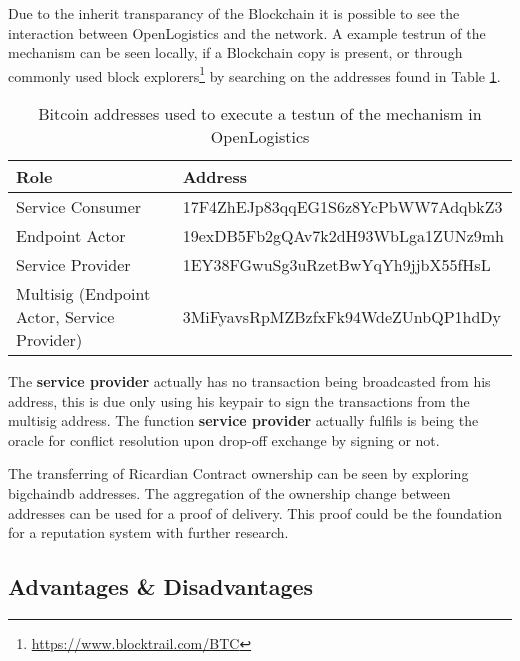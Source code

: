 Due to the inherit transparancy of the Blockchain it is possible to see the interaction between OpenLogistics and the network. A example testrun of the mechanism can be seen locally, if a Blockchain copy is present, or through commonly used block explorers\footnote{\url{https://www.blocktrail.com/BTC}}
 by searching on the addresses found in Table \ref{tab:addresses}.

\begin{table}[h]
  \begin{tabular}{ll}
    \hline
    \multicolumn{1}{|l|}{Role}                  & \multicolumn{1}{l|}{Address}                            \\ \hline
    \multicolumn{1}{|l|}{Service Consumer}      & \multicolumn{1}{l|}{17F4ZhEJp83qqEG1S6z8YcPbWW7AdqbkZ3} \\ \hline
    \multicolumn{1}{|l|}{Endpoint Actor}        & \multicolumn{1}{l|}{19exDB5Fb2gQAv7k2dH93WbLga1ZUNz9mh} \\ \hline
    \multicolumn{1}{|l|}{Service Provider}      & \multicolumn{1}{l|}{1EY38FGwuSg3uRzetBwYqYh9jjbX55fHsL} \\ \hline
    \multicolumn{1}{|l|}{Multisig (Endpoint Actor, Service Provider)}      & \multicolumn{1}{l|}{3MiFyavsRpMZBzfxFk94WdeZUnbQP1hdDy } \\ \hline
  \end{tabular}
  \caption{Bitcoin addresses used to execute a testun of the mechanism in OpenLogistics}
  \label{tab:addresses}
\end{table}

The \textbf{service provider} actually has no transaction being broadcasted from his address, this is due only using his keypair to sign the transactions from the multisig address. The function \textbf{service provider} actually fulfils is being the oracle for conflict resolution upon drop-off exchange by signing or not.\par
The transferring of Ricardian Contract ownership can be seen by exploring bigchaindb addresses. The aggregation of the ownership change between addresses can be used for a proof of delivery. This proof could be the foundation for a reputation system with further research.

\subsection{Advantages \& Disadvantages}


